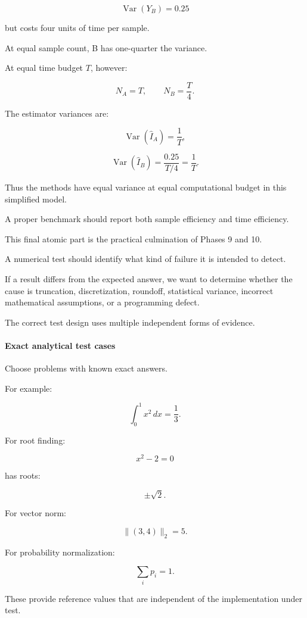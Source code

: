 \[ \operatorname{Var}(Y_B)=0.25 \]

but costs four units of time per sample.

At equal sample count, B has one-quarter the variance.

At equal time budget \(T\), however:

\[ N_A=T, \qquad N_B=\frac T4. \]

The estimator variances are:

\[ \operatorname{Var}(\hat I_A)=\frac1T, \]

\[ \operatorname{Var}(\hat I_B) = \frac{0.25}{T/4} =\frac1T. \]

Thus the methods have equal variance at equal computational budget in this simplified model.

A proper benchmark should report both sample efficiency and time efficiency.

This final atomic part is the practical culmination of Phases 9 and 10.

A numerical test should identify what kind of failure it is intended to detect.

If a result differs from the expected answer, we want to determine whether the cause is truncation, discretization, roundoff, statistical variance, incorrect mathematical assumptions, or a programming defect.

The correct test design uses multiple independent forms of evidence.

\paragraph{Exact analytical test cases}\label{exact-analytical-test-cases}

Choose problems with known exact answers.

For example:

\[ \int_0^1x^2\,dx=\frac13. \]

For root finding:

\[ x^2-2=0 \]

has roots:

\[ \pm\sqrt2. \]

For vector norm:

\[ \|(3,4)\|_2=5. \]

For probability normalization:

\[ \sum_ip_i=1. \]

These provide reference values that are independent of the implementation under test.

